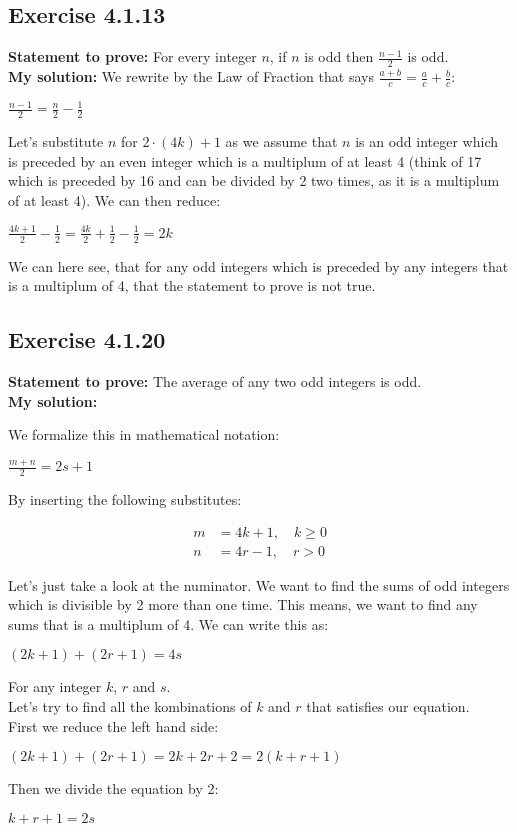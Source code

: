 \documentclass{article}
\newcommand{\cent}[1]{\begin{center}#1\end{center}}
\newcommand{\mAlign}[1]{\begin{align*}#1\end{align*}}
\newcommand{\Prove}{\textbf{Statement to prove: }}
\newcommand{\Solution}{\textbf{My solution: }}
\newcommand{\QED}{\boxed{}}
\newcommand{\Exercise}[1]{\subsection{Exercise #1}}
\begin{document}
	\Exercise{4.1.13}
	\Prove
	For every integer $n$, if $n$ is odd then $\frac{n-1}{2}$ is odd.\\
	
	\Solution
	We rewrite by the Law of Fraction that says $\frac{a+b}{c} = \frac{a}{c} + \frac{b}{c}$:
	
	\cent{$\frac{n - 1}{2} = \frac{n}{2} - \frac{1}{2}$}
	
	Let's substitute $n$ for $2\cdot (4k) + 1$ as we assume that $n$ is an odd integer which is preceded by an even integer which is a multiplum of at least 4 (think of 17 which is preceded by 16 and can be divided by 2 two times, as it is a multiplum of at least 4). We can then reduce:
	
	\cent{$\frac{4k +1}{2} - \frac{1}{2} = \frac{4k}{2} + \frac{1}{2} - \frac{1}{2} = 2k$}
	
	We can here see, that for any odd integers which is preceded by any integers that is a multiplum of 4, that the statement to prove is not true.\\
	\QED
	
	\Exercise{4.1.20}
	\Prove
	The average of any two odd integers is odd.\\
	
	\Solution
	
	We formalize this in mathematical notation:
	
	\cent{$\frac{m +n }{2} = 2s + 1$}
	
	By inserting the following substitutes:
	
	\mAlign{m &= 4k + 1, \quad  k \geq 0\\
				  n &= 4r -1, \quad r > 0}
	
	Let's just take a look at the numinator. We want to find the sums of odd integers which is divisible by 2 more than one time. This means, we want to find any sums that is a multiplum of 4. We can write this as:
	
	\cent{$(2k+1)+(2r+1)=4s$}
	
	For any integer $k$, $r$ and $s$.\\
	
	Let's try to find all the kombinations of $k$ and $r$ that satisfies our equation.\\
	
	First we reduce the left hand side:
	
	\cent{$(2k+1)+ (2r+1) = 2k + 2r + 2 = 2(k+r + 1 )$}
	
	Then we divide the equation by 2:
	
	\cent{$k+r+1=2s$}
	
\end{document}
